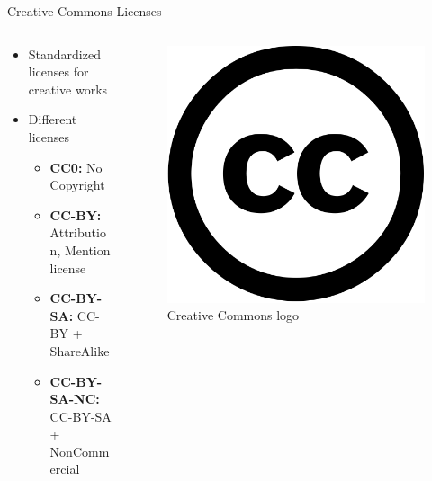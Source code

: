\documentclass[compress,aspectratio=169]{beamer}
\begin{document}
  \begin{frame}{Creative Commons Licenses}
    \begin{columns}
      \begin{column}{0.6\textwidth}
		    \begin{itemize}
		    	\item Standardized licenses for creative works
          \item Different licenses
            \begin{itemize}
              \item \textbf{CC0:} No Copyright
              \item \textbf{CC-BY:} Attribution, Mention license
              \item \textbf{CC-BY-SA:} CC-BY + ShareAlike
              \item \textbf{CC-BY-SA-NC:} CC-BY-SA + NonCommercial
            \end{itemize}
		    \end{itemize}
      \end{column}
      \begin{column}{0.4\textwidth}
        \begin{figure}
          \includegraphics[width=\textwidth]{./assets/cc.png}
          \caption{Creative Commons logo \cite{gfonts}}
        \end{figure}
      \end{column}
    \end{columns}
	\end{frame}
\end{document}
